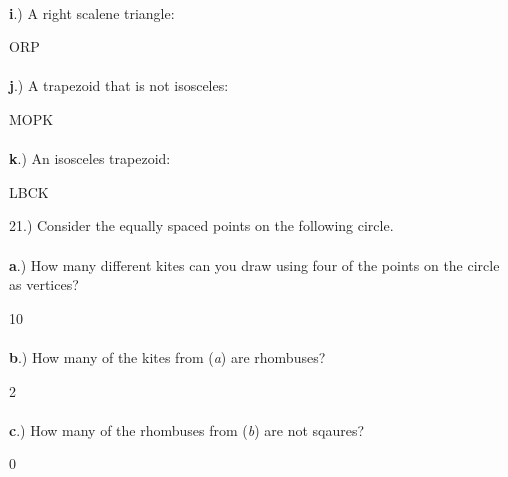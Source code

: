 \documentclass[12pt]{article}
\begin{document}
{\paragraph{}\textbf{i}.) A right scalene triangle: \begin{center} ORP \end{center} 
\paragraph{}\textbf{j}.) A trapezoid that is not isosceles: \begin{center} MOPK \end{center} 
\paragraph{}\textbf{k}.) An isosceles trapezoid: \begin{center} LBCK \end{center} 
}
{\setlength{\parindent}{0cm}
21.) Consider the equally spaced points on the following circle. 
\paragraph{}\textbf{a}.) How many different kites can you draw using four of the points on the circle as vertices? \begin{center} 10 \end{center} 
\paragraph{}\textbf{b}.) How many of the kites from (\textit{a}) are rhombuses? \begin{center} 2 \end{center} 
\paragraph{}\textbf{c}.) How many of the rhombuses from (\textit{b}) are not sqaures? \begin{center} 0 \end{center} 
}
\end{document}
